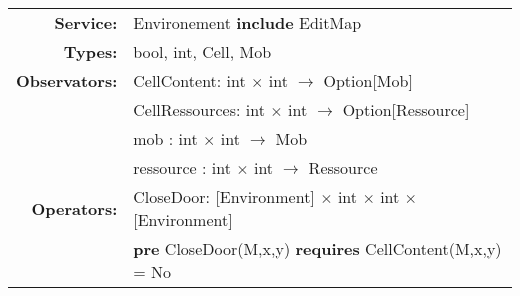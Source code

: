 \documentclass[11pt]{article}
\begin{document}
\begin{tabular}{rl}
\textbf{Service:}	& Environement \textbf{include} EditMap\\
\textbf{Types:} & bool, int, Cell, Mob\\
\textbf{Observators:} & CellContent: int $\times$ int $\rightarrow$ Option[Mob]\\
&
CellRessources: int $\times$ int $\rightarrow$ Option[Ressource]\\
&
mob : int $\times$ int $\rightarrow$ Mob\\
&
ressource : int $\times$ int $\rightarrow$ Ressource\\
\textbf{Operators:}  & CloseDoor: [Environment] $\times$ int $\times$ int $\times$ [Environment]\\
& \quad 
\textbf{pre} CloseDoor(M,x,y) \textbf{requires} CellContent(M,x,y) = No
\end{tabular}
\end{document}
